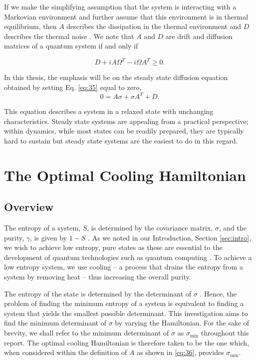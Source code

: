 \documentclass[11pt,a4paper]{article}
\numberwithin{equation}{section}
\begin{document}
	If we make the simplifying assumption that the system is interacting with a Markovian environment and further assume that this environment is in thermal equilibrium, then $A$ describes the dissipation in the thermal environment and $D$ describes the thermal noise \cite{Serafini17}. We note that $A$ and $D$ are drift and diffusion matrices of a quantum system if and only if \cite{Serafini17}
	
	\begin{equation} \label{eq:37}
	D + iA \Omega^T - i\Omega A^T \geq 0.
	\end{equation}
		
	In this thesis, the emphasis will be on the steady state diffusion equation obtained by setting Eq. \ref{eq:35} equal to zero,
	\begin{equation} \label{eq:38}
	0 = A\sigma +\sigma A^{T} + D.
	\end{equation}
	
	This equation describes a system in a relaxed state with unchanging characteristics. Steady state systems are appealing from a practical perspective; within dynamics, while most states can be readily prepared, they are typically hard to sustain but steady state systems are the easiest to do in this regard.
	
	
	\section{The Optimal Cooling Hamiltonian}
	\label{sec:optimalcooling}
	\subsection{Overview}
	The entropy of a system, $S$, is determined by the covariance matrix, $\sigma$, and the purity, $\gamma$, is given by $1-S$ \cite{Genoni16}. As we noted in our Introduction, Section \ref{sec:intro}, we wish to achieve low entropy, pure states as these are essential to the development of quantum technologies such as quantum computing \cite{Chuang}. To achieve a low entropy system, we use cooling -- a process that drains the entropy from a system by removing heat -- thus increasing the overall purity.
	
	The entropy of the state is determined by the determinant of $\sigma$ \cite{Genoni16}. Hence, the problem of finding the minimum entropy of a system is equivalent to finding a system that yields the smallest possible determinant. This investigation aims to find the minimum determinant of $\sigma$ by varying the Hamiltonian. For the sake of brevity, we shall refer to the minimum determinant of $\sigma$ as $\sigma_\text{min}$ throughout this report. The optimal cooling Hamiltonian is therefore taken to be the one which, when considered within the definition of $A$ as shown in \ref{eq:36}, provides $\sigma_\text{min}$. 
	
\end{document}
